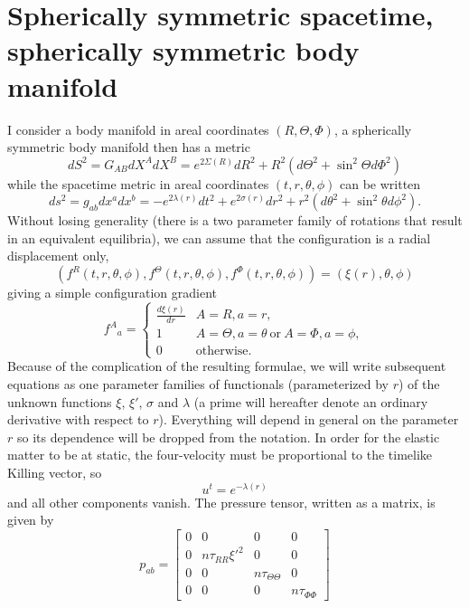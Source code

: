 \section{Spherically symmetric spacetime, spherically symmetric body
manifold}

I consider a body manifold in areal coordinates $(R,\Theta,\Phi)$, a
spherically symmetric body manifold then has a metric
\begin{equation}
dS^2 = G_{AB}dX^AdX^B = e^{2\Sigma(R)}dR^2 + R^2(d\Theta^2 +
\sin^2\Theta d\Phi^2)
\end{equation}
while the spacetime metric in areal coordinates $(t,r,\theta,\phi)$  can be written
\begin{equation}
ds^2 = g_{ab}dx^adx^b = -e^{2\lambda(r)}dt^2 + e^{2\sigma(r)}dr^2 + r^2(d\theta^2 +
\sin^2\theta d\phi^2).
\end{equation}
Without losing generality (there is a two parameter family of rotations that result in an equivalent equilibria), we can assume that the configuration is a
radial displacement only,
\begin{equation}
(f^R(t,r,\theta,\phi), f^\Theta(t,r,\theta,\phi),
f^\Phi(t,r,\theta,\phi)) = (\xi(r), \theta, \phi)
\end{equation}
giving a simple configuration gradient
\begin{equation}
f^A{}_a = \left\{
\begin{array}{lr}
\frac{d\xi(r)}{dr} & A=R,a=r, \\
1 & A=\Theta,a=\theta\ \mathrm{ or }\ A=\Phi,a=\phi, \\
0 & \mathrm{otherwise}.
\end{array}
\right.
\end{equation}
Because of the complication of the resulting formulae, we will write
subsequent equations as one parameter families of functionals 
(parameterized by $r$) of the unknown functions $\xi$,
$\xi'$, $\sigma$ and $\lambda$ (a prime will hereafter denote an
ordinary derivative with respect to $r$). Everything will depend in
general on the parameter $r$ so its dependence will be dropped from the
notation. In order for the elastic matter
to be at static, the four-velocity must be proportional to
the timelike Killing vector, so
\begin{equation}
u^t = e^{-\lambda(r)}
\end{equation}
and all other components vanish. The pressure tensor, written as a
matrix, is given by
\begin{equation}
p_{ab} = \left[
  \begin{array}{cccc}
    0 & 0 & 0 & 0 \\
    0 & n\tau_{RR}\xi'^2 & 0 & 0 \\
    0 & 0 & n\tau_{\Theta\Theta} & 0 \\
    0 & 0 & 0 & n\tau_{\Phi\Phi} 
  \end{array}
\right]
\end{equation}
